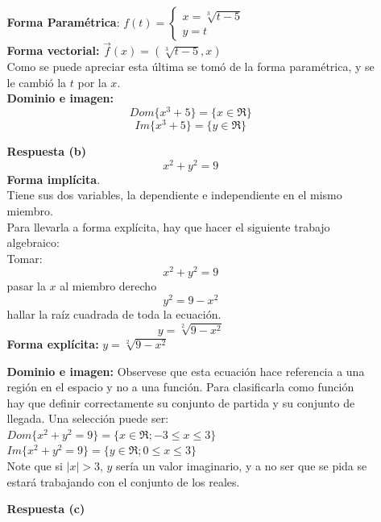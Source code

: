 \documentclass[10pt,twoside]{SelfArx} %
\begin{document}
\begin{enumerate}
\begin{enumerate}
	\textbf{Forma Paramétrica}: $ f(t)=\begin{cases}
	x=\sqrt[3]{t-5}\\
	y=t
	\end{cases} $
	\\
	\textbf{Forma vectorial:} $ \vec{f}(x)=(\sqrt[3]{t-5},x) $
	\\Como se puede apreciar esta última se tomó de la forma paramétrica, y se le cambió la $ t $ por la $ x $.\\
	\textbf{Dominio e imagen:}
	\[ Dom\{x^{3}+5\}=\{x\in\Re\} \]
	\[ Im\{x^{3}+5\}=\{y\in\Re\} \]
	\item[\textbf{Respuesta (b)}]
	\[ x^{2}+y^{2}=9 \]\textbf{Forma implícita}.\\
	Tiene sus dos variables, la dependiente e independiente en el mismo miembro.\\
	Para llevarla a forma explícita, hay que hacer el siguiente trabajo algebraico:\\
	Tomar:
	\[ x^{2}+y^{2}=9 \]
	pasar la $ x $ al miembro derecho
	\[ y^{2}=9-x^{2} \]
	hallar la ra\'iz cuadrada de toda la ecuaci\'on.
	\[ y=\sqrt[2]{9-x^{2}} \]
	\textbf{Forma explícita:} $ y=\sqrt[2]{9-x^{2}} $
	
	\textbf{Dominio e imagen:}
	Observese que esta ecuación hace referencia a una región en el espacio y no a una función. Para clasificarla como función hay que definir correctamente su conjunto de partida y su conjunto de llegada. Una selección puede ser:\\
	$ Dom\{x^{2}+y^{2}=9\} = \{ x\in\Re; -3\leq x\leq3 \} $\\
	$ Im\{x^{2}+y^{2}=9\}=\{y\in\Re; 0\leq x\leq3\} $\\
	Note que si $ |x|>3 $, $ y $ sería un valor imaginario, y a no ser que se pida se estará trabajando con el conjunto de los reales.
	\item[\textbf{Respuesta (c)}]
	

\end{enumerate}
\end{enumerate}
\end{document}
